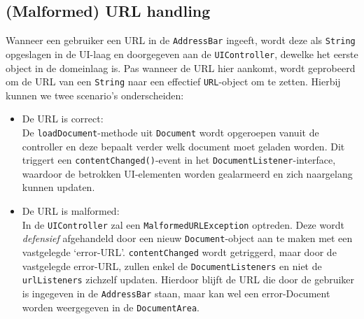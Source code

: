 \documentclass[12pt]{article}
\begin{document}
\subsection{(Malformed) URL handling}
Wanneer een gebruiker een URL in de \texttt{AddressBar} ingeeft, wordt deze als \texttt{String} opgeslagen in de UI-laag en doorgegeven aan de \texttt{UIController}, dewelke het eerste object in de domeinlaag is. Pas wanneer de URL hier aankomt, wordt geprobeerd om de URL van een \texttt{String} naar een effectief \texttt{URL}-object om te zetten. Hierbij kunnen we twee scenario's onderscheiden:
\begin{itemize}
	\item De URL is correct:\\
	De \texttt{loadDocument}-methode uit \texttt{Document} wordt opgeroepen vanuit de controller en deze bepaalt verder welk document moet geladen worden. Dit triggert een \texttt{contentChanged()}-event in het \texttt{DocumentListener}-interface, waardoor de betrokken UI-elementen worden gealarmeerd en zich naargelang kunnen updaten.
	\item De URL is malformed:\\
	In de \texttt{UIController} zal een \texttt{MalformedURLException} optreden. Deze wordt \textit{defensief} afgehandeld door een nieuw \texttt{Document}-object aan te maken met een vastgelegde `error-URL'. \texttt{contentChanged} wordt getriggerd, maar door de vastgelegde error-URL, zullen enkel de \texttt{DocumentListeners} en niet de \texttt{urlListeners} zichzelf updaten. Hierdoor blijft de URL die door de gebruiker is ingegeven in de \texttt{AddressBar} staan, maar kan wel een error-Document worden weergegeven in de \texttt{DocumentArea}.
\end{itemize}
\end{document}
